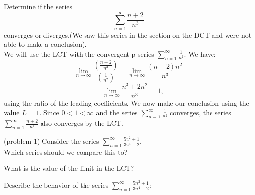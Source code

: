 \documentclass{ximera}
\begin{document}
\begin{example}[example 1]
Determine if the series 
\[
\sum_{n=1}^\infty \frac{n+2}{n^3}
\]
converges or diverges.(We saw this series in the section on the DCT and were not able to make a conclusion).\\
We will use the LCT with the convergent p-series $\displaystyle{\sum_{n=1}^\infty \frac{1}{n^2}}$. We have:
\[
\lim_{n \to \infty} \frac{\left(\frac{n+2}{n^3}\right)}{\left(\frac{1}{n^2}\right)} = \lim_{n \to \infty} \frac{(n+2)n^2}{n^3}
\]
\[
= \lim_{n \to \infty} \frac{n^3 +2n^2}{n^3} = 1,
\]
using the ratio of the leading coefficients. We now make our conclusion using the value $L = 1$. Since $0 < 1 < \infty$ and the series $\displaystyle{\sum_{n=1}^\infty \frac{1}{n^2}}$
converges, the series $\displaystyle{\sum_{n=1}^\infty \frac{n+2}{n^3}}$ also converges by the LCT.
\end{example}




\begin{problem}(problem 1)
Consider the series $\displaystyle{\sum_{n=1}^\infty \frac{5n^2 + 1}{3n^4 - 2}}$.\\
Which series should we compare this to?

\begin{multipleChoice}
\end{multipleChoice}

What is the value of the limit in the LCT?
\begin{multipleChoice}
\end{multipleChoice}

Describe the behavior of the series $\displaystyle{\sum_{n=1}^\infty \frac{5n^2 + 1}{3n^4 - 2}:}$
\begin{multipleChoice}
\end{multipleChoice}

\end{problem}
\end{document}

